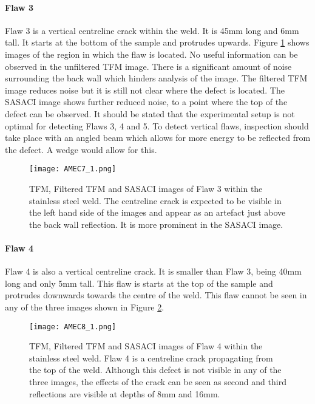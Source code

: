 \clearpage

\paragraph{Flaw 3}

Flaw 3 is a vertical centreline crack within the weld. It is 45mm long and 6mm tall. It starts at the bottom of the sample and protrudes upwards. Figure \ref{fig:AMEC_flaw3} shows images of the region in which the flaw is located. No useful information can be observed in the unfiltered TFM image. There is a significant amount of noise surrounding the back wall which hinders analysis of the image. The filtered TFM image reduces noise but it is still not clear where the defect is located. The SASACI image shows further reduced noise, to a point where the top of the defect can be observed. It should be stated that the experimental setup is not optimal for detecting Flaws 3, 4 and 5. To detect vertical flaws, inspection should take place with an angled beam which allows for more energy to be reflected from the defect. A wedge would allow for this.


\begin{figure}[h!]
\centering
		\texttt{[image: AMEC7\_1.png]}
		\caption{TFM, Filtered TFM and SASACI images of Flaw 3 within the stainless steel weld. The centreline crack is expected to be visible in the left hand side of the images and appear as an artefact just above the back wall reflection. It is more prominent in the SASACI image.}
		\label{fig:AMEC_flaw3}
\end{figure}

\clearpage

\paragraph{Flaw 4}

Flaw 4 is also a vertical centreline crack. It is smaller than Flaw 3, being 40mm long and only 5mm tall. This flaw is starts at the top of the sample and protrudes downwards towards the centre of the weld. This flaw cannot be seen in any of the three images shown in Figure \ref{fig:AMEC_flaw4}.

\vspace{20mm}

\begin{figure}[h!]
\centering
		\texttt{[image: AMEC8\_1.png]}
		\caption{TFM, Filtered TFM and SASACI images of Flaw 4 within the stainless steel weld. Flaw 4 is a centreline crack propagating from the top of the weld. Although this defect is not visible in any of the three images, the effects of the crack can be seen as second and third reflections are visible at depths of 8mm and 16mm.}
		\label{fig:AMEC_flaw4}
\end{figure}

